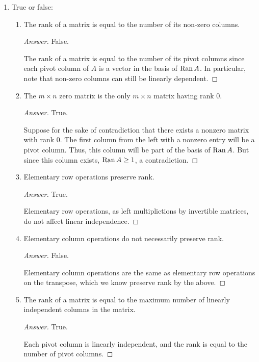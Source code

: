 \documentclass[../psets.tex]{subfiles}
\begin{document}
\begin{enumerate}[label={\textbf{7.\arabic*.}}]
    \item True or false:
    \begin{enumerate}
        \item The rank of a matrix is equal to the number of its non-zero columns.
        \begin{proof}[Answer]
            False.\par
            The rank of a matrix is equal to the number of its pivot columns since each pivot column of $A$ is a vector in the basis of $\operatorname{Ran} A$. In particular, note that non-zero columns can still be linearly dependent.
        \end{proof}
        \item The $m\times n$ zero matrix is the only $m\times n$ matrix having rank 0.
        \begin{proof}[Answer]
            True.\par
            Suppose for the sake of contradiction that there exists a nonzero matrix with rank 0. The first column from the left with a nonzero entry will be a pivot column. Thus, this column will be part of the basis of $\operatorname{Ran} A$. But since this column exists, $\operatorname{Ran} A\geq 1$, a contradiction.
        \end{proof}
        \item Elementary row operations preserve rank.
        \begin{proof}[Answer]
            True.\par
            Elementary row operations, as left multiplictions by invertible matrices, do not affect linear independence.
        \end{proof}
        \item Elementary column operations do not necessarily preserve rank.
        \begin{proof}[Answer]
            False.\par
            Elementary column operations are the same as elementary row operations on the transpose, which we know preserve rank by the above.
        \end{proof}
        \item The rank of a matrix is equal to the maximum number of linearly independent columns in the matrix.
        \begin{proof}[Answer]
            True.\par
            Each pivot column is linearly independent, and the rank is equal to the number of pivot columns.

\end{proof}
\end{enumerate}
\end{enumerate}
\end{document}

